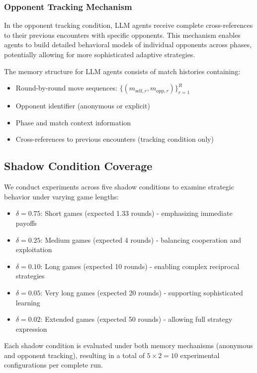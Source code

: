 \subsubsection{Opponent Tracking Mechanism}
In the opponent tracking condition, LLM agents receive complete cross-references to their previous encounters with specific opponents. This mechanism enables agents to build detailed behavioral models of individual opponents across phases, potentially allowing for more sophisticated adaptive strategies.

The memory structure for LLM agents consists of match histories containing:
\begin{itemize}
    \item Round-by-round move sequences: $\{(m_{\text{self},r}, m_{\text{opp},r})\}_{r=1}^{R}$
    \item Opponent identifier (anonymous or explicit)
    \item Phase and match context information
    \item Cross-references to previous encounters (tracking condition only)
\end{itemize}

\subsection{Shadow Condition Coverage}

We conduct experiments across five shadow conditions to examine strategic behavior under varying game lengths:

\begin{itemize}
    \item $\delta = 0.75$: Short games (expected 1.33 rounds) - emphasizing immediate payoffs
    \item $\delta = 0.25$: Medium games (expected 4 rounds) - balancing cooperation and exploitation
    \item $\delta = 0.10$: Long games (expected 10 rounds) - enabling complex reciprocal strategies  
    \item $\delta = 0.05$: Very long games (expected 20 rounds) - supporting sophisticated learning
    \item $\delta = 0.02$: Extended games (expected 50 rounds) - allowing full strategy expression
\end{itemize}

Each shadow condition is evaluated under both memory mechanisms (anonymous and opponent tracking), resulting in a total of $5 \times 2 = 10$ experimental configurations per complete run.

